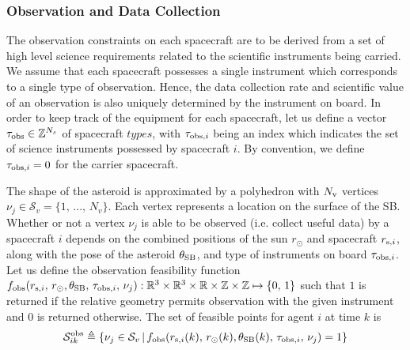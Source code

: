 \documentclass[12pt]{article}
\begin{document}
\subsubsection*{Observation and Data Collection}
The observation constraints on each spacecraft are to be derived from a set of high level science requirements related to the scientific instruments being carried. We assume that each spacecraft possesses a single instrument which corresponds to a single type of observation. Hence, the data collection rate and scientific value of an observation is also uniquely determined by the instrument on board. In order to keep track of the equipment for each spacecraft, let us define a vector $\tau_{\rm obs}\in \mathbb{Z}^{N_s}$ of spacecraft $types$, with $\tau_{{\rm obs},i} $ being an index which indicates the set of science instruments possessed by spacecraft $i$. By convention, we define $\tau_{{\rm obs},i}=0$ for the carrier spacecraft. 

The shape of the asteroid is approximated by a polyhedron with $N_{\rm v}$ vertices $\nu_j \in \mathcal{S}_{v} = \{1,\,...,\,N_v\}$. Each vertex represents a location on the surface of the SB. Whether or not a vertex $\nu_j$ is able to be observed (i.e. collect useful data) by a spacecraft $i$ depends on the combined positions of the sun $r_\odot$ and spacecraft $r_{{\rm s,}i}$, along with the pose of the asteroid $\theta_{\rm SB}$, and type of instruments on board $\tau_{{\rm obs},i}$. 
Let us define the observation feasibility function $f_{\rm obs}( r_{{\rm s},i},\, r_\odot, \theta_{\rm SB},\, \tau_{{\rm obs},i},\, \nu_j):\mathbb{R}^3\times\mathbb{R}^3\times\mathbb{R}\times\mathbb{Z}\times\mathbb{Z} \mapsto \{0,\,1\} $ such that $1$ is returned if the relative geometry permits observation with the given instrument and $0$ is returned otherwise. 
The set of feasible points for agent $i$ at time $k$ is 
\begin{equation}
    \mathcal{S}^{\rm obs}_{ik} \triangleq \{\nu_j \in \mathcal{S}_v \,|\, f_{\rm obs}
    ( r_{{\rm s},i}(k),\, r_\odot(k), \theta_{\rm SB}(k),\, \tau_{{\rm obs},i},\, \nu_j) = 1 \}
\end{equation}
\end{document}
